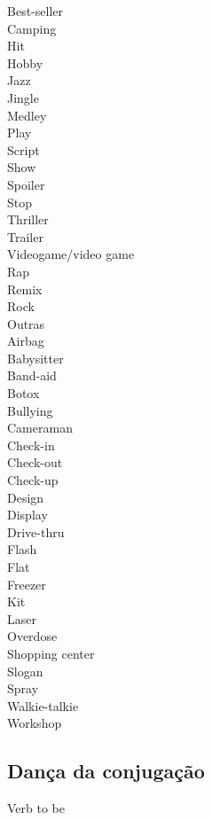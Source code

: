 \documentclass[12pt,a4paper]{article} %
\begin{document}
		Best-seller\\
		Camping\\
		Hit\\
		Hobby\\
		Jazz\\
		Jingle\\
		Medley\\
		Play\\
		Script\\
		Show\\
		Spoiler\\
		Stop\\
		Thriller\\
		Trailer\\
		Videogame/video game\\
		Rap\\
		Remix\\
		Rock\\

	Outras\\
		
		Airbag\\
		Babysitter\\
		Band-aid\\
		Botox\\
		Bullying\\
		Cameraman\\
		Check-in\\
		Check-out\\
		Check-up\\
		Design\\
		Display\\
		Drive-thru\\
		Flash\\
		Flat\\
		Freezer\\
		Kit\\
		Laser\\
		Overdose\\
		Shopping center\\
		Slogan\\
		Spray\\
		Walkie-talkie\\
		Workshop\\
	
\subsection{Dança da conjugação}

	Verb to be\\
	
\end{document}
